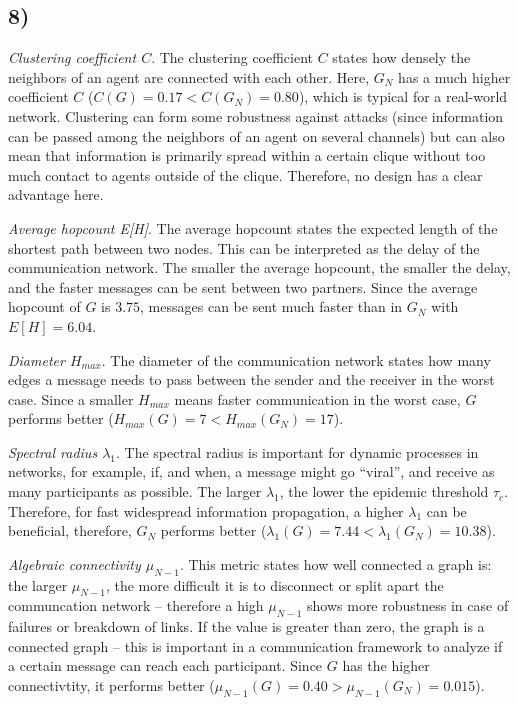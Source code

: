 \documentclass{article}
\begin{document}
\subsection*{8)}

\noindent\emph{Clustering coefficient $C$}. The clustering coefficient $C$
states how densely the neighbors of an agent are connected with each
other. Here, $G_N$ has a much higher coefficient $C$ ($C(G) = 0.17 <
C(G_N) = 0.80$), which is typical for a real-world network. Clustering
can form some robustness against attacks (since information can be
passed among the neighbors of an agent on several channels) but can
also mean that information is primarily spread within a certain clique
without too much contact to agents outside of the clique. Therefore,
no design has a clear advantage here.

\vspace*{0.5em}
\noindent
\emph{Average hopcount E[H]}. The average hopcount states the expected
length of the shortest path between two nodes. This can be interpreted
as the delay of the communication network. The smaller the average
hopcount, the smaller the delay, and the faster messages can be sent
between two partners. Since the average hopcount of $G$ is $3.75$,
messages can be sent much faster than in $G_N$ with $E[H] = 6.04$.

\vspace*{0.5em}
\noindent\emph{Diameter $H_{max}$}. The diameter of the communication network
states how many edges a message needs to pass between the sender and
the receiver in the worst case. Since a smaller $H_{max}$ means faster
communication in the worst case, $G$ performs better ($H_{max}(G) = 7
< H_{max}(G_N) = 17$).

\vspace*{0.5em}
\noindent\emph{Spectral radius $\lambda_1$}.
The spectral radius is important for dynamic processes in networks,
for example, if, and when, a message might go ``viral'', and receive
as many participants as possible. The larger $\lambda_1$, the lower
the epidemic threshold $\tau_c$. Therefore, for fast widespread
information propagation, a higher $\lambda_1$ can be beneficial,
therefore, $G_N$ performs better ($\lambda_1(G) = 7.44 <
\lambda_1(G_N) = 10.38$).

\vspace*{0.5em}
\noindent%
\emph{Algebraic connectivity $\mu_{N-1}$}. This metric states how well
connected a graph is: the larger $\mu_{N-1}$, the more difficult it is
to disconnect or split apart the communcation network -- therefore a
high $\mu_{N-1}$ shows more robustness in case of failures or
breakdown of links. If the value is greater than zero, the graph is a
connected graph -- this is important in a communication framework to
analyze if a certain message can reach each participant. Since $G$ has
the higher connectivtity, it performs better ($\mu_{N-1}(G) = 0.40 >
\mu_{N-1}(G_N) = 0.015$).
\end{document}
